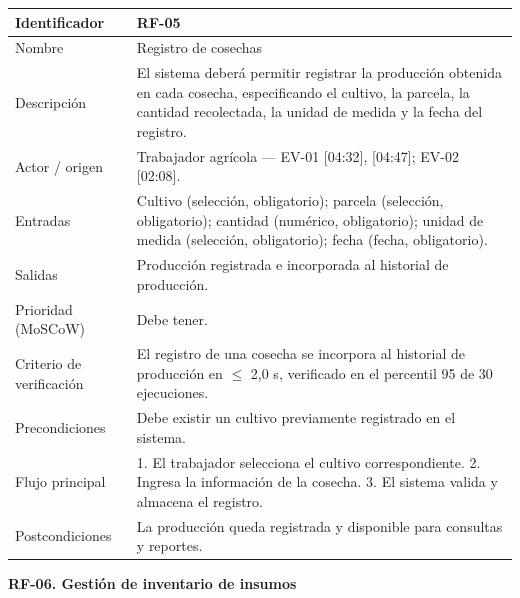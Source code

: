 \documentclass[12pt,a4paper]{article}
\begin{document}
\begin{center}
\begin{longtable}{|p{3.5cm}|p{10.7cm}|}
\hline
Identificador & RF-05 \\
\hline
Nombre & Registro de cosechas \\
\hline
Descripción & El sistema deberá permitir registrar la producción obtenida en cada cosecha, especificando el cultivo, la parcela, la cantidad recolectada, la unidad de medida y la fecha del registro. \\
\hline
Actor / origen & Trabajador agrícola --- EV-01 [04:32], [04:47]; EV-02 [02:08]. \\
\hline
Entradas & Cultivo (selección, obligatorio); parcela (selección, obligatorio); cantidad (numérico, obligatorio); unidad de medida (selección, obligatorio); fecha (fecha, obligatorio). \\
\hline
Salidas & Producción registrada e incorporada al historial de producción. \\
\hline
Prioridad (MoSCoW) & Debe tener. \\
\hline
Criterio de verificación & El registro de una cosecha se incorpora al historial de producción en $\leq$ 2,0 s, verificado en el percentil 95 de 30 ejecuciones. \\
\hline
Precondiciones & Debe existir un cultivo previamente registrado en el sistema. \\
\hline
Flujo principal & 1. El trabajador selecciona el cultivo correspondiente. 2. Ingresa la información de la cosecha. 3. El sistema valida y almacena el registro. \\
\hline
Postcondiciones & La producción queda registrada y disponible para consultas y reportes. \\
\hline
\end{longtable}
\end{center}

\bigskip
\noindent\textbf{RF-06. Gestión de inventario de insumos}
\label{tab:RF-06}
\end{document}
